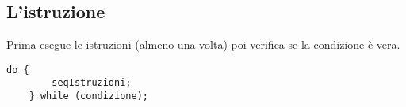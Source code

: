 \documentclass[../main.tex]{subfiles}
\begin{document}
\vspace{0.25cm}
\subsection{L'istruzione }
Prima esegue le istruzioni (almeno una volta) poi verifica se la condizione è vera.
\begin{lstlisting}[style=java]
    do {
        seqIstruzioni;
    } while (condizione);
\end{lstlisting}
\end{document}
